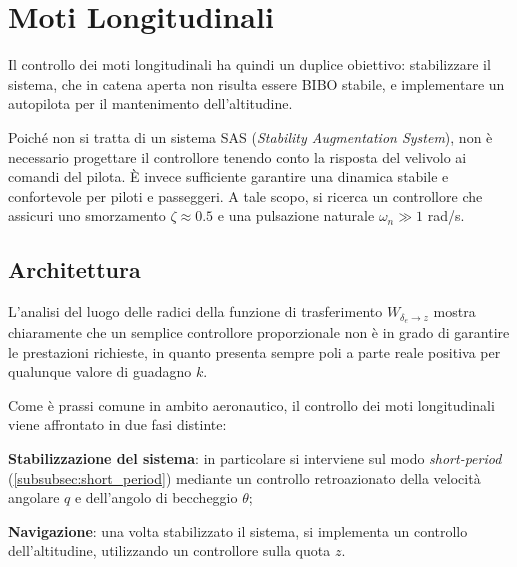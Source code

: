 \section{Moti Longitudinali}

Il controllo dei moti longitudinali ha quindi un duplice obiettivo: stabilizzare il sistema, che in catena aperta non risulta essere BIBO stabile, e implementare un autopilota per il mantenimento dell'altitudine.

Poiché non si tratta di un sistema SAS (\textit{Stability Augmentation System}), non è necessario progettare il controllore tenendo conto la risposta del velivolo ai comandi del pilota.
È invece sufficiente garantire una dinamica stabile e confortevole per piloti e passeggeri. A tale scopo, si ricerca un controllore che assicuri uno smorzamento $\zeta \approx 0.5$ e una pulsazione naturale $\omega_n \gg 1$ rad/s.

\subsection{Architettura}

L'analisi del luogo delle radici della funzione di trasferimento $W_{\delta_e \rightarrow z}$ mostra chiaramente che un semplice controllore proporzionale non è in grado di garantire le prestazioni richieste, in quanto presenta sempre poli a parte reale positiva per qualunque valore di guadagno $k$.

Come è prassi comune in ambito aeronautico, il controllo dei moti longitudinali viene affrontato in due fasi distinte:
\begin{sitemize}
    \item \textbf{Stabilizzazione del sistema}: in particolare si interviene sul modo \textit{short-period} (\ref{subsubsec:short_period}) mediante un controllo retroazionato della velocità angolare $q$ e dell'angolo di beccheggio $\theta$;
    \item \textbf{Navigazione}: una volta stabilizzato il sistema, si implementa un controllo dell'altitudine, utilizzando un controllore sulla quota $z$.
\end{sitemize}


